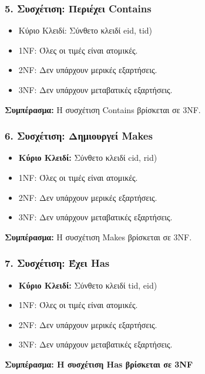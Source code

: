 \documentclass{article}
\begin{document}
\subsubsection*{5. Συσχέτιση: Περιέχει Contains}
\begin{itemize}
    \item Κύριο Κλειδί: Σύνθετο κλειδί eid, tid)
    \item 1NF: Όλες οι τιμές είναι ατομικές.
    \item 2NF: Δεν υπάρχουν μερικές εξαρτήσεις.
    \item 3NF: Δεν υπάρχουν μεταβατικές εξαρτήσεις.
\end{itemize}
\textbf{Συμπέρασμα:} Η συσχέτιση Contains βρίσκεται σε 3NF.

\subsubsection*{6. Συσχέτιση: Δημιουργεί Makes}
\begin{itemize}
    \item \textbf{Κύριο Κλειδί:} Σύνθετο κλειδί cid, rid)
    \item 1NF: Όλες οι τιμές είναι ατομικές.
    \item 2NF: Δεν υπάρχουν μερικές εξαρτήσεις.
    \item 3NF: Δεν υπάρχουν μεταβατικές εξαρτήσεις.
\end{itemize}
\textbf{Συμπέρασμα:} Η συσχέτιση Makes βρίσκεται σε 3NF.

\subsubsection*{7. Συσχέτιση: Έχει Has}
\begin{itemize}
    \item \textbf{Κύριο Κλειδί:} Σύνθετο κλειδί tid, eid)
    \item 1NF: Όλες οι τιμές είναι ατομικές.
    \item 2NF: Δεν υπάρχουν μερικές εξαρτήσεις.
    \item 3NF: Δεν υπάρχουν μεταβατικές εξαρτήσεις.
\end{itemize}
\textbf{Συμπέρασμα: Η συσχέτιση Has βρίσκεται σε 3NF}
\end{document}
